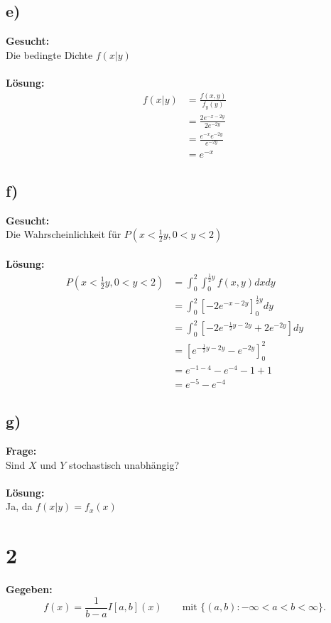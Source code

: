 \documentclass{article}
\begin{document}
\subsection*{e)}
\textbf{Gesucht:} \\

Die bedingte Dichte $f(x|y)$\\\\
\textbf{Lösung:}\\
\begin{align*}
    f(x|y) &= \frac{f(x,y)}{f_y(y)} \\
    &=\frac{2e^{-x-2y}}{2e^{-2y}} \\
    &= \frac{e^{-x} e^{-2y}}{e^{-2y}} \\
    &= e^{-x}
\end{align*}

\subsection*{f)}
\textbf{Gesucht:} \\

Die Wahrscheinlichkeit für $P(x< \frac{1}{2}y, 0 < y < 2)$\\\\
\textbf{Lösung:}
\begin{align*}
    P(x < \frac{1}{2}y, 0 < y < 2) &= \int_{0}^{2} \int_0^{\frac{1}{2}y} f(x,y) dx dy \\
    &= \int_{0}^{2} \left[-2e^{-x-2y}\right]^{\frac{1}{2}y}_0 dy \\
    &= \int_{0}^{2} \left[-2e^{-\frac{1}{2}y - 2y} + 2e^{-2y}\right] dy \\
    &= \left[e^{-\frac{1}{2}y - 2y} - e^{-2y}\right]_0^{2} \\
    &= e^{-1 - 4} - e^{-4} - 1 + 1 \\
    &= e^{-5} -e^{-4}
\end{align*}

\subsection*{g)}
\textbf{Frage:}\\

Sind $X$ und $Y$ stochastisch unabhängig?\\\\
\textbf{Lösung:} \\

Ja, da $f(x|y) = f_x(x)$
\section*{2}
\textbf{Gegeben:} \\
\[f(x) = \frac{1}{b-a}I{[a,b]}(x)\qquad \text{mit }\{(a,b): -\infty < a < b < \infty\}.\]
\end{document}
